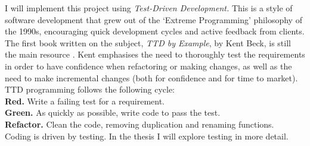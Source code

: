 \documentclass[10pt]{article}
\begin{document}
I will implement this project using \emph{Test-Driven Development.} This is a style of software development that grew out of the `Extreme Programming' philosophy of the 1990s, encouraging quick development cycles and active feedback from clients. The first book written on the subject, \emph{TTD by Example}, by Kent Beck, is still the main resource \cite{Beck03}. Kent emphasises the need to thoroughly test the requirements in order to have confidence when refactoring or making changes, as well as the need to make incremental changes (both for confidence and for time to market). TTD programming follows the following cycle: \\
\indent \textbf{Red.} Write a failing test for a requirement. \\
\indent \textbf{Green.} As quickly as possible, write code to pass the test. \\
\indent \textbf{Refactor.} Clean the code, removing duplication and renaming functions. \\
Coding is driven by testing. In the thesis I will explore testing in more detail.
\end{document}
